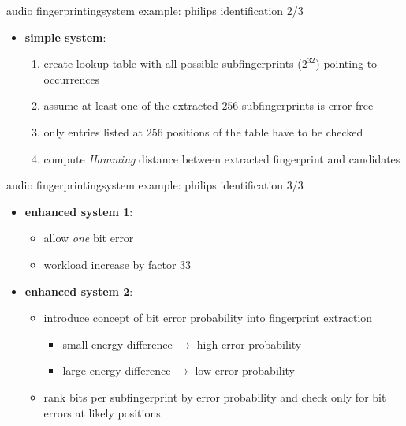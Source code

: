         \begin{frame}{audio fingerprinting}{system example: philips identification 2/3}
            \begin{itemize}
                \item \textbf{simple system}:
                    \begin{enumerate}
                        \item	create lookup table with all possible subfingerprints ($2^{32}$) pointing to occurrences
                        \bigskip
                        \item<2->	assume at least one of the extracted $256$ subfingerprints is error-free\\
                        \item<2->[$\Rightarrow$] only entries listed at $256$ positions of the table have to be checked
                        \bigskip
                        \item<3->	compute \textit{Hamming} distance between extracted fingerprint and candidates
                    \end{enumerate}
            \end{itemize}
        \end{frame}
        
        \begin{frame}{audio fingerprinting}{system example: philips identification 3/3}
            \begin{itemize}
                \item \textbf{enhanced system 1}: 
                    \begin{itemize}
                        \item	allow \textit{one} bit error 
                        \item<2->[$\Rightarrow$] workload increase by factor $33$
                     \end{itemize}
               \bigskip
                \item<3-> \textbf{enhanced system 2}: 
                    \begin{itemize}
                        \item<3->	introduce concept of bit error probability into fingerprint extraction
                            \begin{itemize}
                                \item	small energy difference $\rightarrow$ high error probability
                                \item	large energy difference $\rightarrow$ low error probability
                            \end{itemize}
                        \bigskip
                        \item<4->	rank bits per subfingerprint by error probability and check only for bit errors at likely positions
                    \end{itemize}
            \end{itemize}
        \end{frame}

